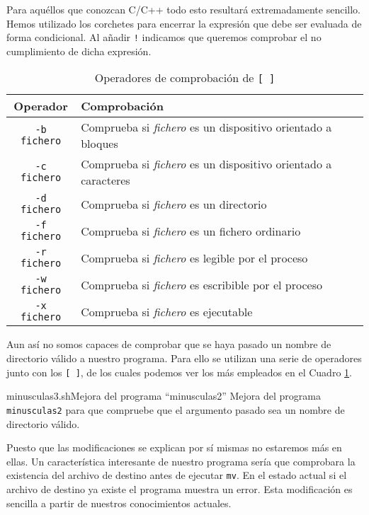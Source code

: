 Para aquéllos  que conozcan  C/C++ todo esto  resultará extremadamente
sencillo. Hemos utilizado los corchetes para encerrar la expresión que
debe ser  evaluada de forma  condicional. Al añadir {\tt  !} indicamos
que queremos comprobar el no cumplimiento de dicha expresión.

\begin{table}[hbtp]
\centering
\begin{tabular}{|c|l|}
\hline
Operador		&	Comprobación \\
\hline
\hline
{\tt -b fichero}	&	Comprueba si {\em fichero} es un dispositivo
orientado a bloques \\
\hline
{\tt -c fichero}	&	Comprueba si {\em fichero} es un dispositivo
orientado a caracteres \\
\hline
{\tt -d fichero}	&	Comprueba si {\em fichero} es un directorio \\
\hline
{\tt -f fichero}	&	Comprueba si {\em fichero} es un fichero
ordinario \\
\hline
{\tt -r fichero}	&	Comprueba si {\em fichero} es legible por el
proceso \\
\hline
{\tt -w fichero}	&	Comprueba si {\em fichero} es escribible por el
proceso \\
\hline
{\tt -x fichero}	&	Comprueba si {\em fichero} es ejecutable \\
\hline
\end{tabular}
\caption{Operadores de comprobación de {\tt[ ]}}\label{corchetes}
\end{table}

Aun así no somos capaces de comprobar  que se haya pasado un nombre de
directorio válido a nuestro programa.  Para ello se utilizan una serie
de operadores junto con  los {\tt [ ]}, de los  cuales podemos ver los
más empleados en el Cuadro \ref{corchetes}.

\begin{ejemplo}{minusculas3.sh}{Mejora del programa ``minusculas2''}
Mejora del programa {\tt minusculas2} para que compruebe
que el argumento pasado sea un nombre de directorio válido.
\end{ejemplo}

Puesto que las  modificaciones se explican por sí  mismas no estaremos
más en ellas. Un característica  interesante de nuestro programa sería
que comprobara la existencia del  archivo de destino antes de ejecutar
{\tt mv}. En  el estado actual si  el archivo de destino  ya existe el
programa muestra un  error. Esta modificación es sencilla  a partir de
nuestros conocimientos actuales.

